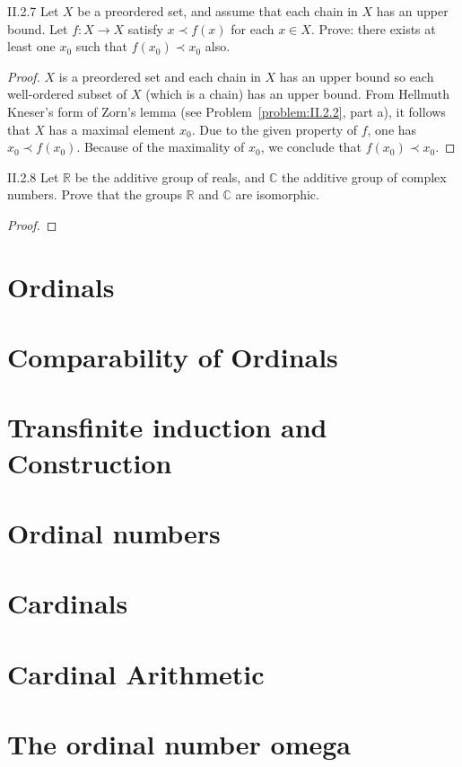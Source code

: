\begin{problem}{II.2.7}
Let \(X\) be a preordered set, and assume that each chain in \(X\) has an upper bound. Let \(f: X \to X\) satisfy \( x \prec f(x) \) for each \( x \in X \). Prove: there exists at least one \(x_{0}\) such that \( f(x_{0}) \prec x_{0} \) also.
\end{problem}

\begin{proof}
    \(X\) is a preordered set and each chain in \(X\) has an upper bound so each well-ordered subset of \(X\) (which is a chain) has an upper bound. From Hellmuth Kneser's form of Zorn's lemma (see Problem~\ref{problem:II.2.2}, part a), it follows that \(X\) has a maximal element \(x_{0}\). Due to the given property of \( f \), one has \( x_{0} \prec f(x_{0}) \). Because of the maximality of \(x_{0}\), we conclude that \( f(x_{0}) \prec x_{0} \).
\end{proof}

\begin{problem}{II.2.8}
Let \( \mathbb{R} \) be the additive group of reals, and \( \mathbb{C} \) the additive group of complex numbers. Prove that the groups \( \mathbb{R} \) and \( \mathbb{C} \) are isomorphic.
\end{problem}

\begin{proof}
\end{proof}

\section{Ordinals}

\section{Comparability of Ordinals}

\section{Transfinite induction and Construction}

\section{Ordinal numbers}

\section{Cardinals}

\section{Cardinal Arithmetic}

\section{The ordinal number omega}
